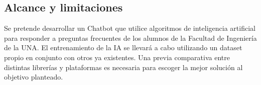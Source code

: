 \subsection{Alcance y limitaciones}

Se pretende desarrollar un Chatbot que utilice algoritmos de inteligencia artificial para responder a preguntas frecuentes de los alumnos de la Facultad de Ingeniería de la
UNA. El entrenamiento de la IA se llevará a cabo utilizando un dataset propio en
conjunto con otros ya existentes. Una previa comparativa entre distintas librerías
y plataformas es necesaria para escoger la mejor solución al objetivo planteado.